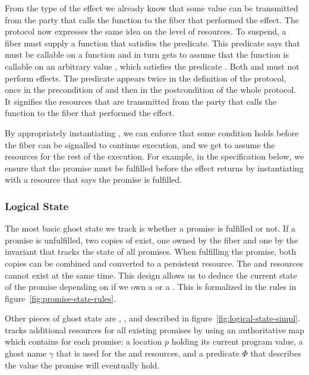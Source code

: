 From the type of the \esuspend{} effect we already know that some value can be transmitted from the party that calls the  function to the fiber that performed the effect.
The \esuspend{} protocol now expresses the same idea on the level of resources.
To suspend, a fiber must supply a function  that satisfies the \isreg{} predicate.
This predicate says that  must be callable on a  function and in turn gets to assume that the  function is callable on an arbitrary value , which satisfies the predicate .
Both  and  must not perform effects.
The predicate  appears twice in the definition of the protocol, once in the precondition of  and then in the postcondition of the whole protocol.
It signifies the resources that are transmitted from the party that calls the  function to the fiber that performed the effect.

By appropriately instantiating , we can enforce that some condition holds before the fiber can be signalled to continue execution, and we get to assume the resources  for the rest of the execution.
For example, in the  specification below, we ensure that the promise must be fulfilled before the effect returns by instantiating  with a resource that says the promise is fulfilled.

\subsubsection{Logical State}
\label{sec:sched-spec-state}

The most basic ghost state we track is whether a promise is fulfilled or not.
If a promise  is unfulfilled, two copies of \gspwait{} exist, one owned by the fiber and one by the invariant that tracks the state of all promises.
When fulfilling the promise, both copies can be combined and converted to a persistent \gspdone{} resource.
The \gspwait{} and \gspdone{} resources cannot exist at the same time.
This design allows us to deduce the current state of the promise depending on if we own a \gspwait{} or a \gspdone{}.
This is formalized in the rules in figure~\ref{fig:promise-state-rules}.

Other pieces of ghost state are \gsPInvIn{}, \gsIsPr{}, and \gsReady{} described in figure~\ref{fig:logical-state-simpl}.
\gsPInvIn{} tracks additional resources for all existing promises by using an authoritative map which contains for each promise:
a location \(p\) holding its current program value, a ghost name \(\gamma\) that is used for the \gspwait{} and \gspdone{} resources, and a predicate \(Φ\) that describes the value the promise will eventually hold.


